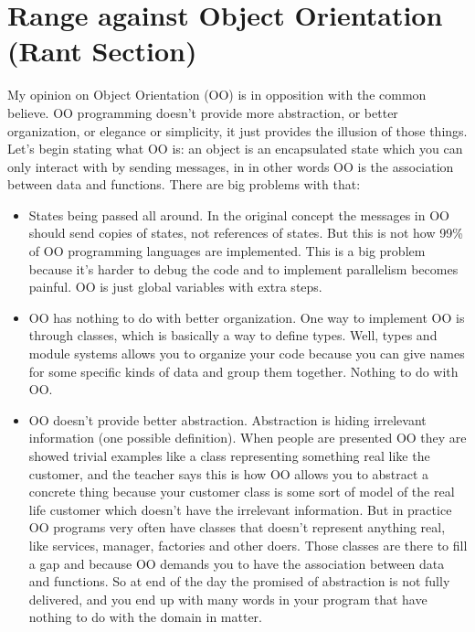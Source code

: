 \documentclass[11pt,a4paper,sans]{moderncv}
\begin{document}

\section{Range against Object Orientation (Rant Section)}
My opinion on Object Orientation (OO) is in opposition with the common believe.
OO programming doesn't provide more abstraction, or better organization, or elegance or simplicity, it just provides the illusion of those things.
Let's begin stating what OO is:
an object is an encapsulated state which you can only interact with by sending messages, in in other words OO is the association between data and functions.
There are big problems with that:
\begin{itemize}
  \item States being passed all around. In the original concept the messages in OO should send copies of states, not references of states.
        But this is not how 99\% of OO programming languages are implemented.
        This is a big problem because it's harder to debug the code and to implement parallelism becomes painful.
        OO is just global variables with extra steps.
  \item OO has nothing to do with better organization. One way to implement OO is through classes, which is basically a way to define types.
        Well, types and module systems allows you to organize your code because you can give names for some specific kinds of data and group them together.
        Nothing to do with OO.
  \item OO doesn't provide better abstraction.
        Abstraction is hiding irrelevant information (one possible definition).
        When people are presented OO they are showed trivial examples like a class representing something real like the customer,
        and the teacher says this is how OO allows you to abstract a concrete thing because your customer class is some sort of model
        of the real life customer which doesn't have the irrelevant information.
        But in practice OO programs very often have classes that doesn't represent anything real, like services, manager, factories and other doers.
        Those classes are there to fill a gap and because OO demands you to have the association between data and functions.
        So at end of the day the promised of abstraction is not fully delivered, and you end up with many words in your program that have nothing to do with the domain in matter.
\end{itemize}
\end{document}
